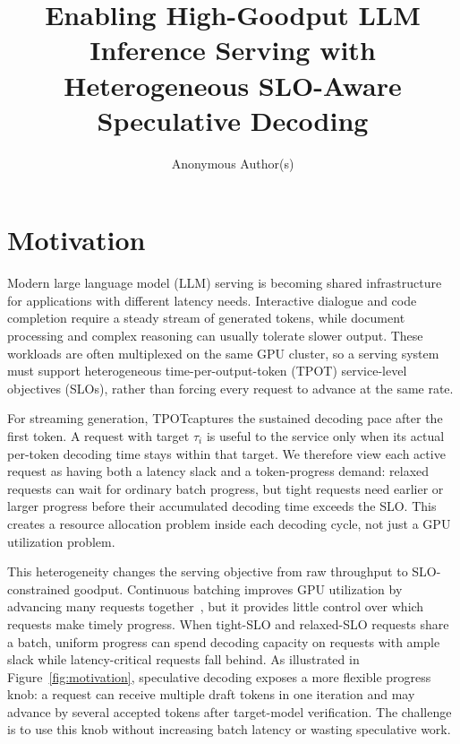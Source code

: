 \documentclass[sigplan,10pt,review,nonacm,anonymous]{acmart}
\newcommand{\tpot}{TPOT}
\newcommand{\goodput}{SLO-constrained goodput}
\begin{document}
\title{Enabling High-Goodput LLM Inference Serving with Heterogeneous SLO-Aware Speculative Decoding}
\author{Anonymous Author(s)}

\pagestyle{plain}
\maketitle

\section*{Motivation}

Modern large language model (LLM) serving is becoming shared infrastructure for applications with different latency needs. Interactive dialogue and code completion require a steady stream of generated tokens, while document processing and complex reasoning can usually tolerate slower output. These workloads are often multiplexed on the same GPU cluster, so a serving system must support heterogeneous time-per-output-token (\tpot) service-level objectives (SLOs), rather than forcing every request to advance at the same rate.

For streaming generation, \tpot captures the sustained decoding pace after the first token. A request with target $\tau_i$ is useful to the service only when its actual per-token decoding time stays within that target. We therefore view each active request as having both a latency slack and a token-progress demand: relaxed requests can wait for ordinary batch progress, but tight requests need earlier or larger progress before their accumulated decoding time exceeds the SLO. This creates a resource allocation problem inside each decoding cycle, not just a GPU utilization problem.

This heterogeneity changes the serving objective from raw throughput to \goodput. Continuous batching improves GPU utilization by advancing many requests together~\cite{vllm}, but it provides little control over which requests make timely progress. When tight-SLO and relaxed-SLO requests share a batch, uniform progress can spend decoding capacity on requests with ample slack while latency-critical requests fall behind. As illustrated in Figure~\ref{fig:motivation}, speculative decoding exposes a more flexible progress knob: a request can receive multiple draft tokens in one iteration and may advance by several accepted tokens after target-model verification. The challenge is to use this knob without increasing batch latency or wasting speculative work.
\end{document}
